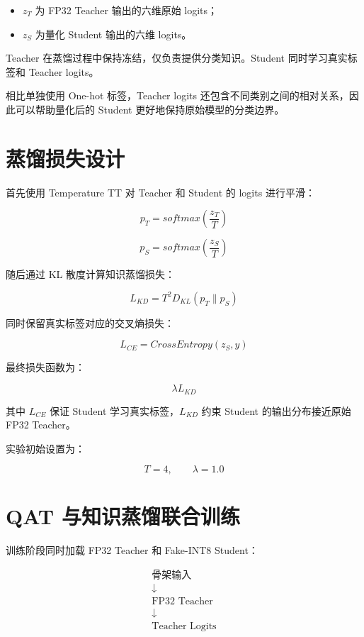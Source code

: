 \begin{itemize}
\item \(z_T\) 为 FP32 Teacher 输出的六维原始 logits；
\item \(z_S\) 为量化 Student 输出的六维 logits。
\end{itemize}

Teacher 在蒸馏过程中保持冻结，仅负责提供分类知识。Student 同时学习真实标签和 Teacher logits。

相比单独使用 One-hot 标签，Teacher logits 还包含不同类别之间的相对关系，因此可以帮助量化后的 Student 更好地保持原始模型的分类边界。


\section{蒸馏损失设计}

首先使用 Temperature TT 对 Teacher 和 Student 的 logits 进行平滑：

\[
p_T=softmax\left(\frac{z_T}{T}\right)
\]

\[
p_S=softmax\left(\frac{z_S}{T}\right)
\]

随后通过 KL 散度计算知识蒸馏损失：

\[
L_{KD}=T^2D_{KL}(p_T\|p_S)
\]

同时保留真实标签对应的交叉熵损失：

\[
L_{CE}=CrossEntropy(z_S,y)
\]

最终损失函数为：

\[
\lambda L_{KD}
\]

其中 \(L_{CE}\) 保证 Student 学习真实标签，\(L_{KD}\) 约束 Student 的输出分布接近原始 FP32 Teacher。

实验初始设置为：

\[
T=4,\qquad \lambda=1.0
\]

\section{QAT 与知识蒸馏联合训练}

训练阶段同时加载 FP32 Teacher 和 Fake-INT8 Student：

\[
\begin{gathered}
\text{骨架输入}\\[-0.2em]
\downarrow\\[-0.2em]
\text{FP32 Teacher}\\[-0.2em]
\downarrow\\[-0.2em]
\text{Teacher Logits}
\end{gathered}
\]

